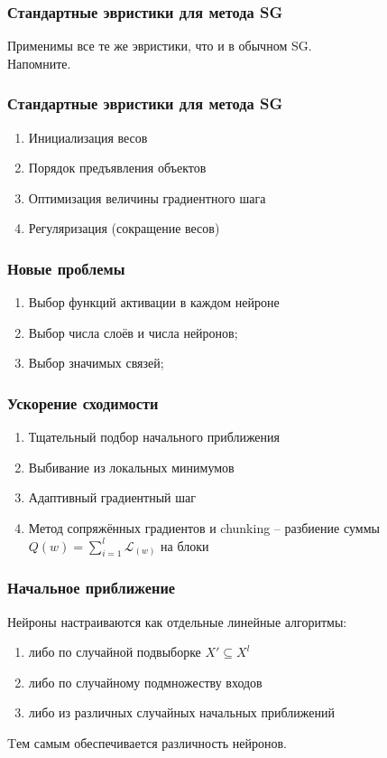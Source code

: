 \documentclass[12pt]{beamer}
\begin{document}
\begin{frame}\frametitle{Стандартные эвристики для метода SG}
Применимы все те же эвристики, что и в обычном SG.\\

Напомните.
\end{frame}

\begin{frame}\frametitle{Стандартные эвристики для метода SG}
\begin{enumerate}[--]
\item Инициализация весов
\item Порядок предъявления объектов
\item Оптимизация величины градиентного шага
\item Регуляризация (сокращение весов)
\end{enumerate}
\end{frame}

\begin{frame}\frametitle{Новые проблемы}
\begin{enumerate}[--]
\item Выбор функций активации в каждом нейроне
\item Выбор числа слоёв и числа нейронов;
\item Выбор значимых связей;
\end{enumerate}
\end{frame}

\begin{frame}\frametitle{Ускорение сходимости}
\begin{enumerate}[--]
\item Тщательный подбор начального приближения
\item Выбивание из локальных минимумов
\item Адаптивный градиентный шаг
\item Метод сопряжённых градиентов и chunking -- разбиение суммы $Q(w) = \sum\limits_{i=1}^l \mathcal{L}_(w)$ на блоки
\end{enumerate}
\end{frame}

\begin{frame}\frametitle{Начальное приближение}
Нейроны настраиваются как отдельные линейные алгоритмы:
\begin{enumerate}[--]
\item либо по случайной подвыборке $X' \subseteq X^l$
\item либо по случайному подмножеству входов
\item либо из различных случайных начальных приближений
\end{enumerate}
Tем самым обеспечивается различность нейронов.
\end{frame}
\end{document}
